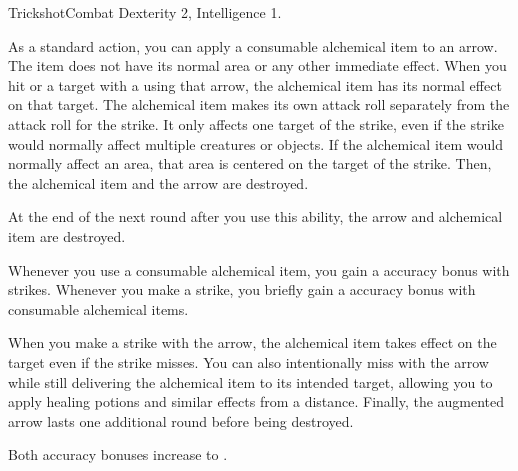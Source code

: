   \begin{feat}{Trickshot}{Combat}
    \featpre Dexterity 2, Intelligence 1.

     As a standard action, you can apply a consumable alchemical item to an arrow.
    The item does not have its normal area or any other immediate effect.
    When you hit or  a target with a  using that arrow, the alchemical item has its normal effect on that target.
    The alchemical item makes its own attack roll separately from the attack roll for the strike.
    It only affects one target of the strike, even if the strike would normally affect multiple creatures or objects.
    If the alchemical item would normally affect an area, that area is centered on the target of the strike.
    Then, the alchemical item and the arrow are destroyed.

    At the end of the next round after you use this ability, the arrow and alchemical item are destroyed.

     Whenever you use a consumable alchemical item, you  gain a  accuracy bonus with strikes.
    Whenever you make a strike, you briefly gain a  accuracy bonus with consumable alchemical items.

     When you make a strike with the arrow, the alchemical item takes effect on the target even if the strike misses.
    You can also intentionally miss with the arrow while still delivering the alchemical item to its intended target, allowing you to apply healing potions and similar effects from a distance.
    Finally, the augmented arrow lasts one additional round before being destroyed.

     Both accuracy bonuses increase to .
  \end{feat}

